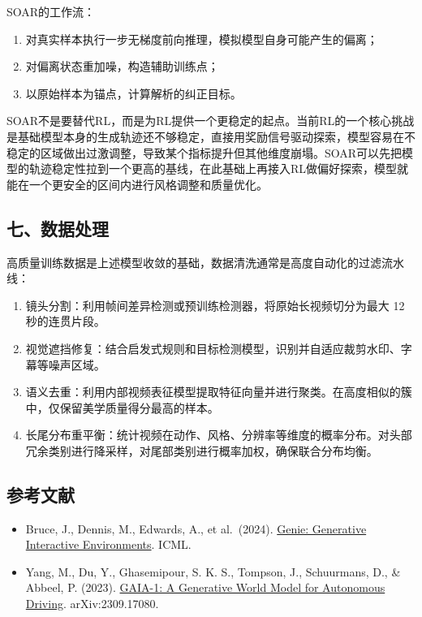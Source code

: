 SOAR的工作流：

\begin{enumerate}
\def\labelenumi{\arabic{enumi}.}
\item
  对真实样本执行一步无梯度前向推理，模拟模型自身可能产生的偏离；
\item
  对偏离状态重加噪，构造辅助训练点；
\item
  以原始样本为锚点，计算解析的纠正目标。
\end{enumerate}

SOAR不是要替代RL，而是为RL提供一个更稳定的起点。当前RL的一个核心挑战是基础模型本身的生成轨迹还不够稳定，直接用奖励信号驱动探索，模型容易在不稳定的区域做出过激调整，导致某个指标提升但其他维度崩塌。SOAR可以先把模型的轨迹稳定性拉到一个更高的基线，在此基础上再接入RL做偏好探索，模型就能在一个更安全的区间内进行风格调整和质量优化。

\hypertarget{ux4e03ux6570ux636eux5904ux7406}{%
\subsection{七、数据处理}\label{ux4e03ux6570ux636eux5904ux7406}}

高质量训练数据是上述模型收敛的基础，数据清洗通常是高度自动化的过滤流水线：

\begin{enumerate}
\def\labelenumi{\arabic{enumi}.}
\item
  镜头分割：利用帧间差异检测或预训练检测器，将原始长视频切分为最大 12 秒的连贯片段。
\item
  视觉遮挡修复：结合启发式规则和目标检测模型，识别并自适应裁剪水印、字幕等噪声区域。
\item
  语义去重：利用内部视频表征模型提取特征向量并进行聚类。在高度相似的簇中，仅保留美学质量得分最高的样本。
\item
  长尾分布重平衡：统计视频在动作、风格、分辨率等维度的概率分布。对头部冗余类别进行降采样，对尾部类别进行概率加权，确保联合分布均衡。
\end{enumerate}

\hypertarget{ux53c2ux8003ux6587ux732e-177}{%
\subsection{参考文献}\label{ux53c2ux8003ux6587ux732e-177}}

\begin{itemize}
\tightlist
\item
  Bruce, J., Dennis, M., Edwards, A., et al.~(2024). \href{https://arxiv.org/abs/2402.15391}{Genie: Generative Interactive Environments}. ICML.
\item
  Yang, M., Du, Y., Ghasemipour, S. K. S., Tompson, J., Schuurmans, D., \& Abbeel, P. (2023). \href{https://arxiv.org/abs/2309.17080}{GAIA-1: A Generative World Model for Autonomous Driving}. arXiv:2309.17080.
\end{itemize}

